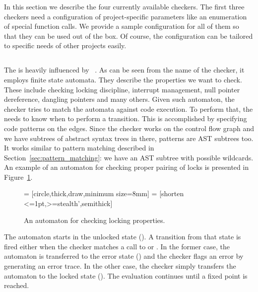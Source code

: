 In this section we describe the four currently available checkers. The first
three checkers need a configuration of project-specific parameters like
an enumeration of special function calls.  We provide a sample configuration for
all of them so that they can be used out of the box. Of course, the
configuration can be tailored to specific needs of other projects easily.

\subsection{\AC}
The \AC is heavily influenced by \xgcc~\cite{metacomp}. As can be seen from
the name of the checker, it employs finite state automata. They describe the
properties we want to check. These include checking locking discipline,
interrupt management, null pointer dereference, dangling pointers and many
others. Given such automaton, the checker tries to match the automata against
code execution. To perform that, the \AC needs to know when to perform a
transition. This is accomplished by specifying code patterns on the edges.
Since the checker works on the control flow graph and we have subtrees of
abstract syntax trees in there, patterns are AST subtrees too. It works
similar to pattern matching described in Section~\ref{sec:pattern_matching}:
we have an AST subtree with possible wildcards. An example of an automaton for
checking proper pairing of locks is presented in
Figure~\ref{fig:stan_automaton}.
\begin{figure}[htb]
  \begin{center}
     = [circle,thick,draw,minimum size=8mm]
     = [shorten <=1pt,>=stealth',semithick]
  \end{center}
  \caption{An automaton for checking locking properties.}
  \label{fig:stan_automaton}
\end{figure}
The automaton starts in the unlocked state (). A transition from that
state is fired either when the checker matches a call to  or
. In the former case, the automaton is transferred to the error
state () and the checker flags an error by generating an error
trace. In the other case, the checker simply transfers the automaton to the
locked state (). The evaluation continues until a fixed point is
reached.

